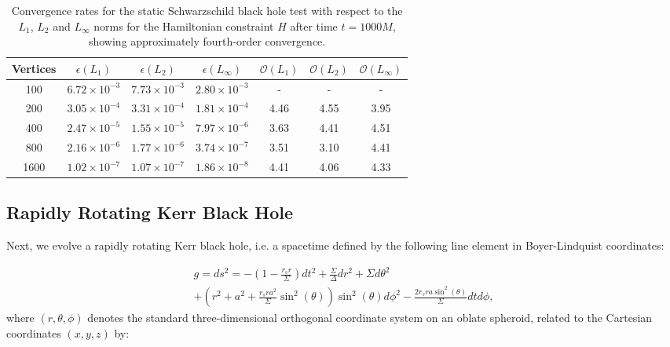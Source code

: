 \documentclass{article}
\begin{document}
\begin{table}[ht]
\centering
\begin{tabular}{|c|c|c|c|c|c|c|}
\hline
Vertices & ${\epsilon \left( L_1 \right)}$ & ${\epsilon \left( L_2 \right)}$ & ${\epsilon \left( L_{\infty} \right)}$ & ${\mathcal{O} \left( L_1 \right)}$ & ${\mathcal{O} \left( L_2 \right)}$ & ${\mathcal{O} \left( L_{\infty} \right)}$\\
\hline\hline
100 & ${6.72 \times 10^{-3}}$ & ${7.73 \times 10^{-3}}$ & ${2.80 \times 10^{-3}}$ & - & - & -\\
\hline
200 & ${3.05 \times 10^{-4}}$ & ${3.31 \times 10^{-4}}$ & ${1.81 \times 10^{-4}}$ & 4.46 & 4.55 & 3.95\\
\hline
400 & ${2.47 \times 10^{-5}}$ & ${1.55 \times 10^{-5}}$ & ${7.97 \times 10^{-6}}$ & 3.63 & 4.41 & 4.51\\
\hline
800 & ${2.16 \times 10^{-6}}$ & ${1.77 \times 10^{-6}}$ & ${3.74 \times 10^{-7}}$ & 3.51 & 3.10 & 4.41\\
\hline
1600 & ${1.02 \times 10^{-7}}$ & ${1.07 \times 10^{-7}}$ & ${1.86 \times 10^{-8}}$ & 4.41 & 4.06 & 4.33\\
\hline
\end{tabular}
\caption{Convergence rates for the static Schwarzschild black hole test with respect to the ${L_1}$, ${L_2}$ and ${L_{\infty}}$ norms for the Hamiltonian constraint $H$ after time ${t = 1000 M}$, showing approximately fourth-order convergence.}
\label{tab:Table1}
\end{table}

\clearpage

\subsection{Rapidly Rotating Kerr Black Hole}

Next, we evolve a rapidly rotating Kerr black hole, i.e. a spacetime defined by the following line element in Boyer-Lindquist coordinates\cite{landau}\cite{visser}\cite{boyer}:

\begin{multline}
g = ds^2 = - \left( 1 - \frac{r_s r}{\Sigma} \right) dt^2 + \frac{\Sigma}{\Delta} dr^2 + \Sigma d \theta^2\\
+ \left( r^2 + a^2 + \frac{r_s r a^2}{\Sigma} \sin^2 \left( \theta \right) \right) \sin^2 \left( \theta \right) d \phi^2 - \frac{2 r_s r a \sin^2 \left( \theta \right)}{\Sigma} dt d \phi,
\end{multline}
where ${\left( r, \theta, \phi \right)}$ denotes the standard three-dimensional orthogonal coordinate system on an oblate spheroid, related to the Cartesian coordinates ${\left( x, y, z \right)}$ by:
\end{document}
